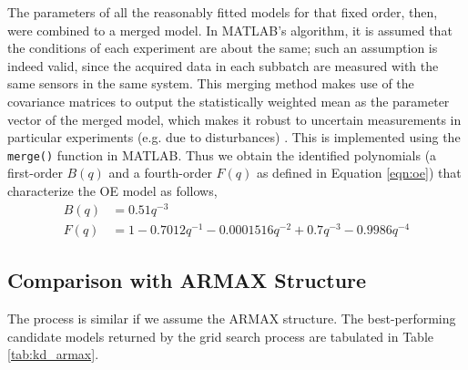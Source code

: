 The parameters of all the reasonably fitted models for that fixed order, then, were combined to a merged model. In MATLAB's algorithm, it is assumed that the conditions of each experiment are about the same; such an assumption is indeed valid, since the acquired data in each subbatch are measured with the same sensors in the same system. This merging method makes use of the covariance matrices to output the statistically weighted mean as the parameter vector of the merged model, which makes it robust to uncertain measurements in particular experiments (e.g. due to disturbances) \cite{matlab_merge}. This is implemented using the \texttt{merge()} function in MATLAB. Thus we obtain the identified polynomials (a first-order $B(q)$ and a fourth-order $F(q)$ as defined in Equation \ref{eqn:oe}) that characterize the OE model as follows, 
\begin{equation*}
    \begin{split}
        B(q) & = 0.51 q^{-3}\\
        F(q) & = 1 - 0.7012 q^{-1} - 0.0001516 q^{-2} + 0.7 q^{-3} - 0.9986 q^{-4}
    \end{split}
\end{equation*}

\subsection*{Comparison with ARMAX Structure}

The process is similar if we assume the ARMAX structure. The best-performing candidate models returned by the grid search process are tabulated in Table \ref{tab:kd_armax}. 

\begin{table}[h]
    \centering
    \caption{Results of ARMAX search for bare fiber diameter controller.}
    \label{tab:kd_armax}
\end{table}

